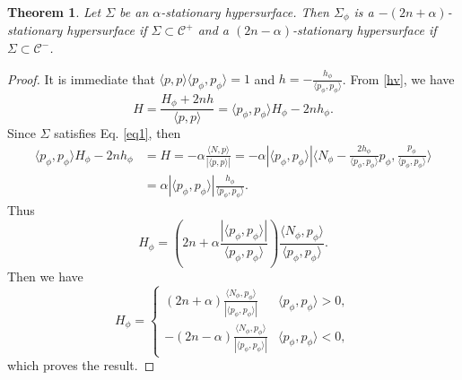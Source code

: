 \documentclass[a4paper,12pt]{amsart}
\newtheorem{theorem}{Theorem}[section]
\theoremstyle{definition}
\begin{document}
\begin{theorem} \label{ti}
Let $\Sigma$ be an $\alpha$-stationary hypersurface. Then $\Sigma_\phi$ is a $-(2n+\alpha)$-stationary hypersurface if $\Sigma\subset\mathcal{C}^+$ and a $(2n-\alpha)$-stationary hypersurface if $\Sigma\subset\mathcal{C}^-$.
\end{theorem}

\begin{proof}
It is immediate that $\langle p,p\rangle \langle p_\phi,p_\phi\rangle=1$ and $h=-\frac{h_\phi}{\langle p_\phi,p_\phi\rangle}$. From \eqref{hv}, we have 
$$H=\frac{H_\phi+2nh}{\langle p,p\rangle}=\langle p_\phi,p_\phi\rangle H_\phi-2n h_\phi.$$
Since $\Sigma$ satisfies Eq. \eqref{eq1}, then 
\begin{equation*}
\begin{split}
\langle p_\phi,p_\phi\rangle H_\phi-2n h_\phi&=H=-\alpha\frac{\langle N,p\rangle}{|\langle p,p\rangle|}
=-\alpha|\langle p_\phi,p_\phi\rangle|\langle N_\phi-\frac{2h_\phi}{\langle p_\phi,p_\phi\rangle}p_\phi,\frac{p_\phi}{\langle p_\phi,p_\phi\rangle}\rangle\\
&=\alpha|\langle p_\phi,p_\phi\rangle|\frac{h_\phi}{\langle p_\phi,p_\phi\rangle}.
\end{split}
\end{equation*}
Thus
$$H_\phi=\left(2n+\alpha\frac{|\langle p_\phi,p_\phi\rangle|}{\langle p_\phi,p_\phi\rangle}\right)\frac{\langle N_\phi,p_\phi\rangle}{\langle p_\phi,p_\phi\rangle}.$$ Then we have
$$H_\phi=\left\{\begin{array}{ll}
(2n+\alpha)\frac{\langle N_\phi,p_\phi\rangle}{|\langle p_\phi,p_\phi\rangle|}&\langle p_\phi,p_\phi\rangle>0,\\
-(2n-\alpha)\frac{\langle N_\phi,p_\phi\rangle}{|\langle p_\phi,p_\phi\rangle|}&\langle p_\phi,p_\phi\rangle<0,
\end{array}
\right.
$$
which proves the result. 
\end{proof}
\end{document}
